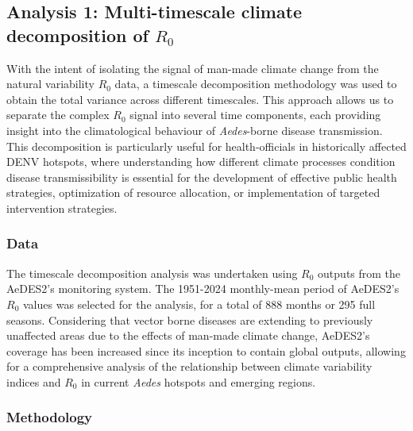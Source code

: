 \documentclass[10pt,twocolumn]{wlscirep}
\begin{document}
\subsection{Analysis 1: Multi-timescale climate decomposition of $R_0$} \label{sec-methods-1-analysis}

With the intent of isolating the signal of man-made climate change from the natural variability $R_0$ data, a timescale decomposition methodology was used to obtain the total variance across different timescales. This approach allows us to separate the complex $R_0$ signal into several time components, each providing insight into the climatological behaviour of \textit{Aedes}-borne disease transmission. This decomposition is particularly useful for health-officials in historically affected DENV hotspots, where understanding how different climate processes condition disease transmissibility is essential for the development of effective public health strategies, optimization of resource allocation, or implementation of targeted intervention strategies\cite{thomson_2018a, munoz_2016}.

\subsubsection{Data} \label{sec-methods-1-data}
The timescale decomposition analysis was undertaken using $R_0$ outputs from the AeDES2's monitoring system. The 1951-2024 monthly-mean period of AeDES2's $R_0$ values was selected for the analysis, for a total of 888 months or 295 full seasons. Considering that vector borne diseases are extending to previously unaffected areas due to the effects of man-made climate change, AeDES2's coverage has been increased since its inception to contain global outputs, allowing for a comprehensive analysis of the relationship between climate variability indices and $R_0$ in current \textit{Aedes} hotspots and emerging regions.

\subsubsection{Methodology} \label{sec-methods-1-methodology}
\end{document}
